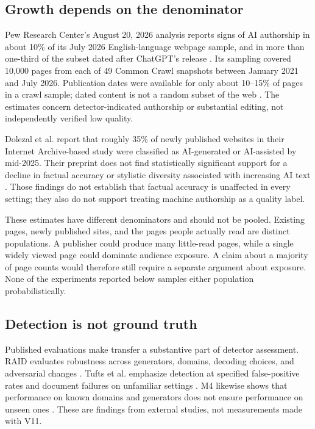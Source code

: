 \documentclass[11pt]{article}
\begin{document}
\subsection{Growth depends on the denominator}
Pew Research Center's August 20, 2026 analysis reports signs of AI authorship
in about 10\% of its July 2026 English-language webpage sample, and in more
than one-third of the subset dated after ChatGPT's release \cite{pew}.
Its sampling covered 10,000 pages from each of 49 Common Crawl snapshots
between January 2021 and July 2026. Publication dates were available for only
about 10--15\% of pages in a crawl sample; dated content is not a random subset
of the web \cite{pewmethods}. The estimates concern detector-indicated
authorship or substantial editing, not independently verified low quality.

Dolezal et al. report that roughly 35\% of newly published websites in their
Internet Archive-based study were classified as AI-generated or AI-assisted
by mid-2025. Their preprint does not find statistically significant support
for a decline in factual accuracy or stylistic diversity associated with
increasing AI text \cite{dolezal}. Those findings do not establish that factual
accuracy is unaffected in every setting; they also do not support treating
machine authorship as a quality label.

These estimates have different denominators and should not be pooled.
Existing pages, newly published sites, and the pages people actually read
are distinct populations. A publisher could produce many little-read pages,
while a single widely viewed page could dominate audience exposure. A claim
about a majority of page counts would therefore still require a separate
argument about exposure. None of the experiments reported below samples
either population probabilistically.

\subsection{Detection is not ground truth}
Published evaluations make transfer a substantive part of detector assessment.
RAID evaluates robustness across generators, domains, decoding choices, and
adversarial changes \cite{raid}. Tufts et al. emphasize detection at specified
false-positive rates and document failures on unfamiliar settings
\cite{tufts}. M4 likewise shows that performance on known domains and generators
does not ensure performance on unseen ones \cite{m4}. These are findings from
external studies, not measurements made with V11.
\end{document}
